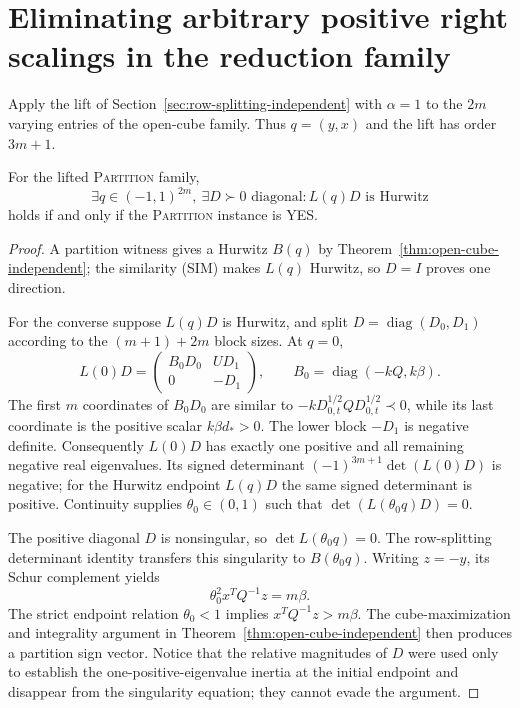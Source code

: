 \section{Eliminating arbitrary positive right scalings in the reduction family}
\label{sec:scaling-independent}

Apply the lift of Section~\ref{sec:row-splitting-independent} with $\alpha=1$
to the $2m$ varying entries of the open-cube family. Thus $q=(y,x)$ and the
lift has order $3m+1$.

\begin{theorem}
\label{thm:scaling-independent}
For the lifted \textsc{Partition} family,
\[
 \exists q\in(-1,1)^{2m},\ \exists D\succ0\text{ diagonal}:
 L(q)D\text{ is Hurwitz}
\]
holds if and only if the \textsc{Partition} instance is YES.
\end{theorem}

\begin{proof}
A partition witness gives a Hurwitz $B(q)$ by
Theorem~\ref{thm:open-cube-independent}; the similarity (SIM) makes $L(q)$
Hurwitz, so $D=I$ proves one direction.

For the converse suppose $L(q)D$ is Hurwitz, and split
$D=\operatorname{diag}(D_0,D_1)$ according to the $(m+1)+2m$ block sizes. At
$q=0$,
\[
 L(0)D=\begin{pmatrix}B_0D_0&UD_1\\0&-D_1\end{pmatrix},
 \qquad
 B_0=\operatorname{diag}(-kQ,k\beta).
\]
The first $m$ coordinates of $B_0D_0$ are similar to
$-kD_{0,t}^{1/2}QD_{0,t}^{1/2}\prec0$, while its last coordinate is the
positive scalar $k\beta d_*>0$. The lower block $-D_1$ is negative definite.
Consequently $L(0)D$ has exactly one positive and all remaining negative real
eigenvalues. Its signed determinant $(-1)^{3m+1}\det(L(0)D)$ is negative;
for the Hurwitz endpoint $L(q)D$ the same signed determinant is positive.
Continuity supplies $\theta_0\in(0,1)$ such that
$\det(L(\theta_0q)D)=0$.

The positive diagonal $D$ is nonsingular, so $\det L(\theta_0q)=0$. The
row-splitting determinant identity transfers this singularity to
$B(\theta_0q)$. Writing $z=-y$, its Schur complement yields
\[
 \theta_0^2x^TQ^{-1}z=m\beta.
\]
The strict endpoint relation $\theta_0<1$ implies
$x^TQ^{-1}z>m\beta$. The cube-maximization and integrality argument in
Theorem~\ref{thm:open-cube-independent} then produces a partition sign
vector. Notice that the relative magnitudes of $D$ were used only to establish
the one-positive-eigenvalue inertia at the initial endpoint and disappear
from the singularity equation; they cannot evade the argument.
\end{proof}
